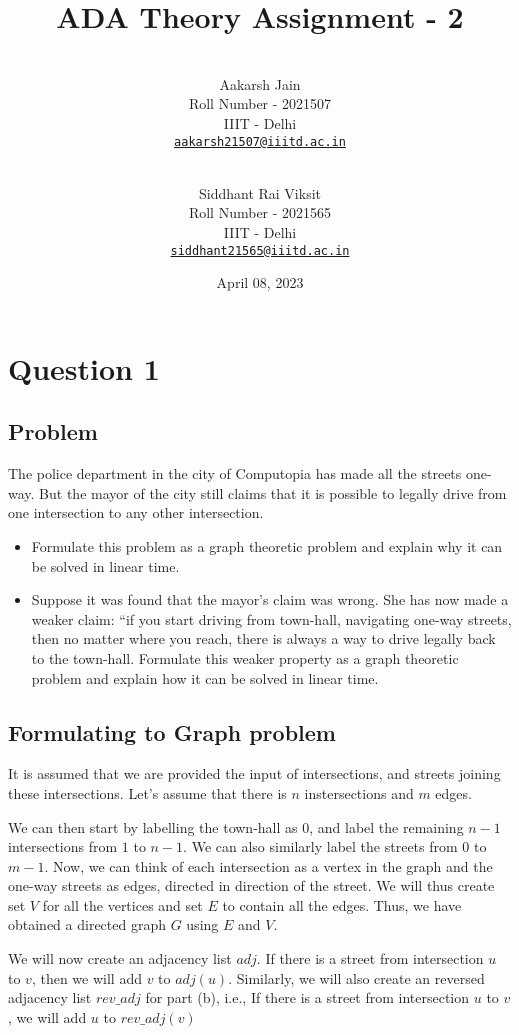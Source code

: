 \documentclass{article}
\title{ADA Theory Assignment - 2}
\author{
    \\\vspace{0em} Aakarsh Jain \\\vspace{-0.5em}
    \footnotesize{Roll Number - 2021507}\\\vspace{-0.5em}
    \footnotesize{IIIT - Delhi}\\\vspace{-0.5em}
    \footnotesize{\href{mailto:aakarsh21507@iiitd.ac.in}{\texttt{aakarsh21507@iiitd.ac.in}}}
  \and
    \\\vspace{0em} Siddhant Rai Viksit \\\vspace{-0.5em}
    \footnotesize{Roll Number - 2021565}\\\vspace{-0.5em}
    \footnotesize{IIIT - Delhi}\\\vspace{-0.5em}
    \footnotesize{\href{mailto:siddhant21565@iiitd.ac.in}{\texttt{siddhant21565@iiitd.ac.in}}} 
    \vspace{1em}
}
\date{April 08, 2023}
\begin{document}
\maketitle

\section{Question 1}

\subsection{Problem}

The police department in the city of Computopia has made all the streets one-way.
But the mayor of the city still claims that it is possible to legally drive from one intersection to any
other intersection.

\begin{itemize}
    \item Formulate this problem as a graph theoretic problem and explain why it can be solved in linear
time.
    \item Suppose it was found that the mayor’s claim was wrong. She has now made a weaker claim: “if
you start driving from town-hall, navigating one-way streets, then no matter where you reach,
there is always a way to drive legally back to the town-hall. Formulate this weaker property as
a graph theoretic problem and explain how it can be solved in linear time.
\end{itemize}

\subsection{Formulating to Graph problem}

It is assumed that we are provided the input of intersections, and streets joining these intersections. Let's assume that there is $n$ instersections and $m$ edges.

We can then start by labelling the town-hall as $0$, and label the remaining $n - 1$ intersections from $1$ to $n - 1$. We can also similarly label the streets from $0$ to $m - 1$. Now, we can think of each intersection as a vertex in the graph and the one-way streets as edges, directed in direction of the street. We will thus create set $V$ for all the vertices and set $E$ to contain all the edges. Thus, we have obtained a directed graph $G$ using $E$ and $V$.

We will now create an adjacency list $adj$. If there is a street from intersection $u$ to $v$, then we will add $v$ to $adj(u)$. Similarly, we will also create an reversed adjacency list $rev\_adj$ for part (b), i.e., If there is a street from intersection $u$ to $v$, we will add $u$ to $rev\_adj(v)$
\end{document}
